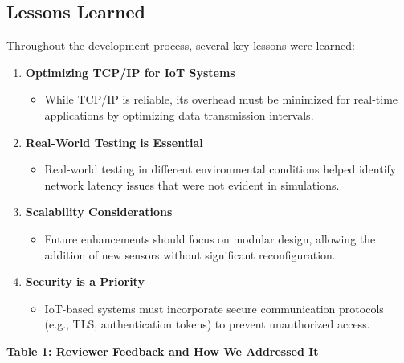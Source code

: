 \documentclass[a4paper]{scrartcl}
\begin{document}
\subsection{Lessons Learned}
Throughout the development process, several key lessons were learned:
\begin{enumerate}
    \item \textbf{Optimizing TCP/IP for IoT Systems}
        \begin{itemize}
            \item While TCP/IP is reliable, its overhead must be minimized for real-time applications by optimizing data transmission intervals.
        \end{itemize}
    \item \textbf{Real-World Testing is Essential}
        \begin{itemize}
            \item Real-world testing in different environmental conditions helped identify network latency issues that were not evident in simulations.
        \end{itemize}
    \item \textbf{Scalability Considerations}
        \begin{itemize}
            \item Future enhancements should focus on modular design, allowing the addition of new sensors without significant reconfiguration.
        \end{itemize}
    \item \textbf{Security is a Priority}
        \begin{itemize}
            \item IoT-based systems must incorporate secure communication protocols (e.g., TLS, authentication tokens) to prevent unauthorized access.
        \end{itemize}
\end{enumerate}

\begin{center}
    \textbf{Table 1: Reviewer Feedback and How We Addressed It}
\end{center}
\end{document}
